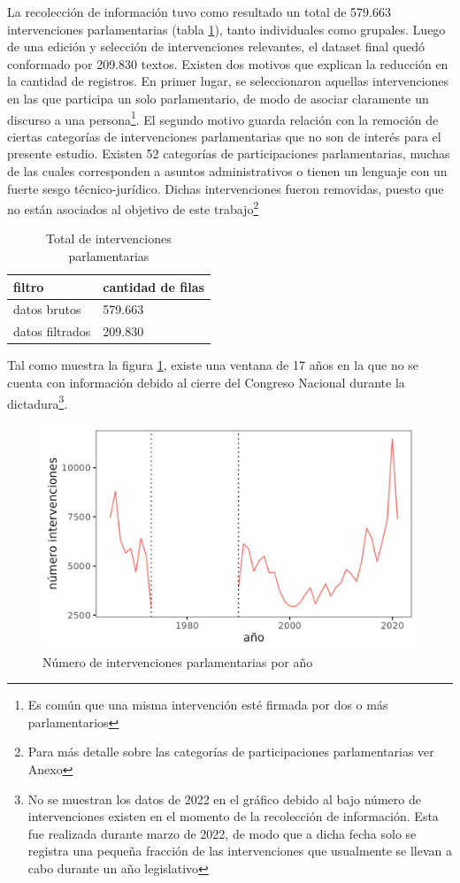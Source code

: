 \documentclass[
  12pt,
]{article}
\begin{document}
La recolección de información tuvo como resultado un total de 579.663
intervenciones parlamentarias (tabla \ref{tab:tabla_pre_post_filtro}),
tanto individuales como grupales. Luego de una edición y selección de
intervenciones relevantes, el dataset final quedó conformado por 209.830
textos. Existen dos motivos que explican la reducción en la cantidad de
registros. En primer lugar, se seleccionaron aquellas intervenciones en
las que participa un solo parlamentario, de modo de asociar claramente
un discurso a una
persona\footnote{Es común que una misma intervención esté firmada por dos o más parlamentarios}.
El segundo motivo guarda relación con la remoción de ciertas categorías
de intervenciones parlamentarias que no son de interés para el presente
estudio. Existen 52 categorías de participaciones parlamentarias, muchas
de las cuales corresponden a asuntos administrativos o tienen un
lenguaje con un fuerte sesgo técnico-jurídico. Dichas intervenciones
fueron removidas, puesto que no están asociados al objetivo de este
trabajo\footnote{Para más detalle sobre las categorías de participaciones parlamentarias ver Anexo}

\begin{table}[H]

\caption{\label{tab:tabla_pre_post_filtro}Total de intervenciones parlamentarias}
\centering
\begin{tabular}[t]{ll}
\toprule
filtro & cantidad de filas\\
\midrule
datos brutos & 579.663\\
datos filtrados & 209.830\\
\bottomrule
\end{tabular}
\end{table}

Tal como muestra la figura \ref{n_year}, existe una ventana de 17 años
en la que no se cuenta con información debido al cierre del Congreso
Nacional durante la
dictadura\footnote{No se muestran los datos de 2022 en el gráfico debido al bajo número de intervenciones existen en el momento de la recolección de información. Esta fue realizada durante marzo de 2022, de modo que a dicha fecha solo se registra una pequeña fracción de las intervenciones que usualmente se llevan a cabo durante un año legislativo}.

\begin{figure}[H]
\centering
\large
\caption{Número de intervenciones parlamentarias por año}
\label{n_year}
\includegraphics[width = 0.5 \textwidth]{cuadros_tesis/plot_n_year.png}
\normalsize
\end{figure}
\end{document}
